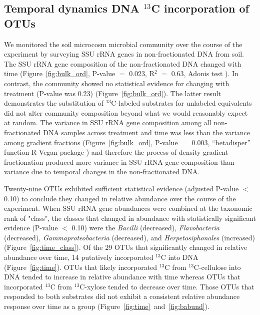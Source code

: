 \subsection{Temporal dynamics DNA $^{13}$C incorporation of OTUs}
We monitored the soil microcosm microbial community over the course of the
experiment by surveying SSU rRNA genes in non-fractionated DNA from soil. The
SSU rRNA gene composition of the non-fractionated DNA changed with time
(Figure~\ref{fig:bulk_ord}, P-value $=$ 0.023, R$^{2}$ $=$ 0.63, Adonis test
\citep{Anderson2001a}). In contrast, the community showed no statistical
evidence for changing with treatment (P-value was 0.23)
(Figure~\ref{fig:bulk_ord}). The latter result demonstrates the substitution of
$^{13}$C-labeled substrates for unlabeled equivalents did not alter community
composition beyond what we would reasonably expect at random. The variance in
SSU rRNA gene composition among all non-fractionated DNA samples across
treatment and time was less than the variance among gradient fractions
(Figure~\ref{fig:bulk_ord}, P-value $=$ 0.003, “betadisper” function R Vegan
package \citep{oksanen2007vegan}) and therefore the process of density gradient
fractionation produced more variance in SSU rRNA gene composition than variance
due to temporal changes in the non-fractionated DNA.

Twenty-nine OTUs exhibited sufficient statistical evidence (adjusted P-value
$<$ 0.10) to conclude they changed in relative abundance over the
course of the experiment. When SSU rRNA gene abundances were combined at
the taxonomic rank of "class", the classes that changed in abundance with
statistically significant evidence (P-value $<$ 0.10) were the
\textit{Bacilli} (decreased), \textit{Flavobacteria} (decreased),
\textit{Gammaproteobacteria} (decreased), and \textit{Herpetosiphonales}
(increased) (Figure~\ref{fig:time_class}). Of the 29 OTUs that
significantly changed in relative abundance over time, 14 putatively
incorporated $^{13}$C into DNA (Figure~\ref{fig:time}). OTUs that likely
incorporated $^{13}$C from $^{13}$C-cellulose into DNA tended to increase
in relative abundance with time whereas OTUs that incorporated $^{13}$C
from $^{13}$C-xylose tended to decrease over time. Those OTUs that
responded to both substrates did not exhibit a consistent relative
abundance response over time as a group
(Figure~\ref{fig:time}~and~\ref{fig:babund}).


